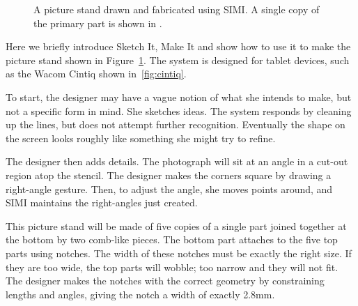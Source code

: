 \documentclass{article}
\begin{document}
\begin{figure}[t]
\centering 
{}
\caption{A picture stand  drawn and fabricated
  using SIMI. A single copy of the primary part is shown in
  . }
\label{fig:simi-example}
\end{figure}

Here we briefly introduce Sketch It, Make It and show how to use it to
make the picture stand shown in Figure~\ref{fig:simi-example}. The
system is designed for tablet devices, such as the Wacom Cintiq shown
in~\ref{fig:cintiq}.

To start, the designer may have a vague notion of what she intends to
make, but not a specific form in mind. She sketches ideas. The system
responds by cleaning up the lines, but does not attempt further
recognition. Eventually the shape on the screen looks roughly like
something she might try to refine.

The designer then adds details. The photograph will sit at an angle in
a cut-out region atop the stencil. The designer makes the corners
square by drawing a right-angle gesture. Then, to adjust the angle,
she moves points around, and SIMI maintains the right-angles just
created.

This picture stand will be made of five copies of a single part joined
together at the bottom by two comb-like pieces. The bottom part
attaches to the five top parts using notches. The width of these
notches must be exactly the right size. If they are too wide, the top
parts will wobble; too narrow and they will not fit. The designer
makes the notches with the correct geometry by constraining lengths
and angles, giving the notch a width of exactly 2.8mm.
\end{document}

